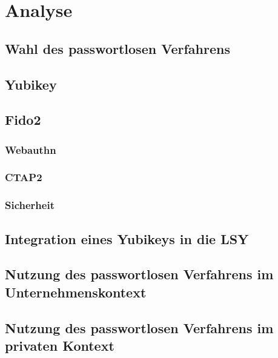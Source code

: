 \chapter{Analyse}

\section{Wahl des passwortlosen Verfahrens}

\section{Yubikey}

\section{Fido2}

\subsection{Webauthn}

\subsection{CTAP2}

\subsection{Sicherheit}

\section{Integration eines Yubikeys in die LSY}

\section{Nutzung des passwortlosen Verfahrens im Unternehmenskontext}

\section{Nutzung des passwortlosen Verfahrens im privaten Kontext}